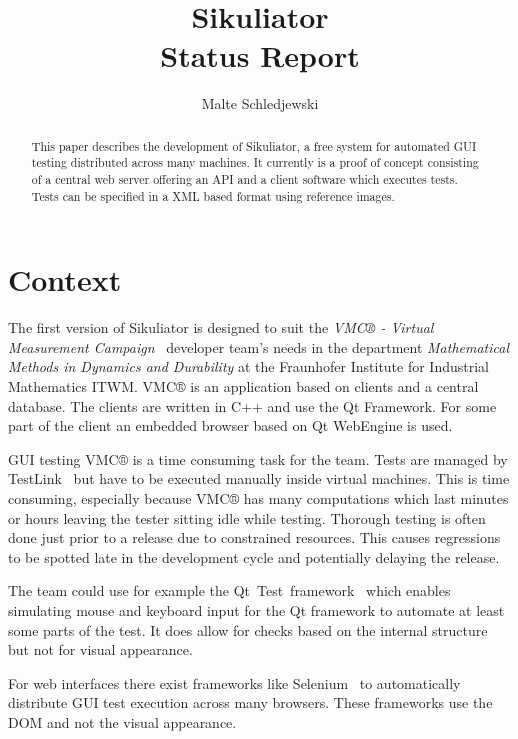 \documentclass[a4paper,twocolumn,twoside]{article}
\title{Sikuliator\\ 
	\large Status Report}
\author{Malte Schledjewski}
\newcommand{\VMC}[0]{VMC®}
\newcommand{\Sik}[0]{Sikuliator}
\begin{document}


\maketitle
\begin{abstract}
	This paper describes the development of \Sik{}, 
	a free system for automated GUI testing distributed across many machines.
	It currently is a proof of concept consisting of a central web server offering an API and 
	a client software which executes tests.
	Tests can be specified in a XML based format using reference images.
\end{abstract}

\tableofcontents

\section{Context}

The first version of \Sik{} is designed to suit the 
\emph{\VMC{} - Virtual Measurement Campaign}~\cite{VMConline} developer team's needs in the
department \emph{Mathematical Methods in Dynamics and Durability} 
at the Fraunhofer Institute for Industrial Mathematics ITWM.
\VMC{} is an application based on clients and a central database.
The clients are written in C++ and use the Qt Framework.
For some part of the client an embedded browser based on Qt WebEngine is used.

GUI testing \VMC{} is a time consuming task for the team.
Tests are managed by TestLink~\cite{TestLink} but have to be executed manually inside virtual machines.
This is time consuming, especially because \VMC{} has many computations which last minutes or hours 
leaving the tester sitting idle while testing. 
Thorough testing is often done just prior to a release due to constrained resources.
This causes regressions to be spotted late in the development cycle and potentially delaying the release. 

The team could use for example the Qt~Test~framework~\cite{QtTest} which enables simulating mouse and keyboard input for the Qt framework to automate at least some parts of the test.
It does allow for checks based on the internal structure but not for visual appearance.

For web interfaces there exist frameworks like Selenium~\cite{Selenium} to automatically distribute GUI test execution across many browsers.
These frameworks use the DOM and not the visual appearance.
\end{document}
